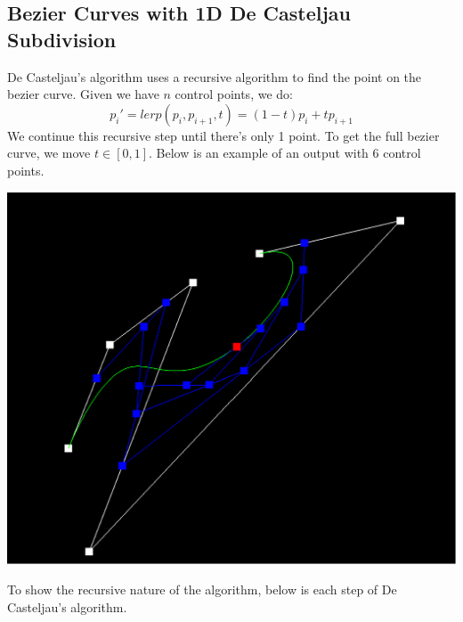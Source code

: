 \documentclass{article}
\begin{document}
\subsection{Bezier Curves with 1D De Casteljau Subdivision}
De  Casteljau's algorithm uses a recursive algorithm to find the point on the bezier curve. Given we have $n$ control points, we do:
$$p_i' = lerp(p_i, p_{i + 1}, t) = (1 - t)p_i + tp_{i + 1}$$
We continue this recursive step until there's only 1 point. To get the full bezier curve, we move $t \in [0, 1]$. Below is an example of an output with 6 control points. 
\begin{center}
    \includegraphics[]{Part 1/bez1.png}
\end{center}
To show the recursive nature of the algorithm, below is each step of De Casteljau's algorithm.
\end{document}
